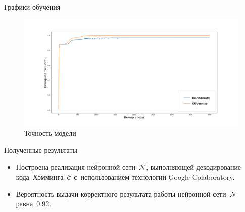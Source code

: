\documentclass{beamer}
\begin{document}
\begin{frame}{Графики обучения}
\begin{figure}[h]
    \centering
    \includegraphics[scale=0.3]{model_binary_accuracy}
    \caption{Точность модели}
    \label{fig:accuracy}
\end{figure}

\end{frame}












\begin{frame}{Полученные результаты}

 \begin{itemize}
  \item {
    Построена реализация нейронной сети~$\mathcal{N}$, выполняющей декодирование кода~Хэмминга~$\mathcal{C}$ с~использованием технологии Google Colaboratory.
  }
  \item {
    Вероятность выдачи корректного результата работы нейронной сети~$\mathcal{N}$ равна~0.92.
  }
  \end{itemize}

\end{frame}
\end{document}
